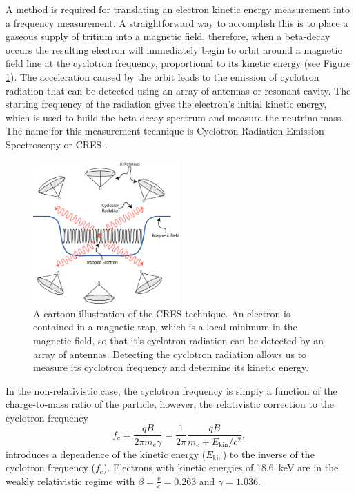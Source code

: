 A method is required for translating an electron kinetic energy measurement into a frequency measurement. A straightforward way to accomplish this is to place a gaseous supply of tritium into a magnetic field, therefore, when a beta-decay occurs the resulting electron will immediately begin to orbit around a magnetic field line at the cyclotron frequency, proportional to its kinetic energy (see Figure \ref{fig:chap3-cres-cartoon}). The acceleration caused by the orbit leads to the emission of cyclotron radiation that can be detected using an array of antennas or resonant cavity. The starting frequency of the radiation gives the electron's initial kinetic energy, which is used to build the beta-decay spectrum and measure the neutrino mass. The name for this measurement technique is Cyclotron Radiation Emission Spectroscopy or CRES \cite{p8originalcres}.

\begin{figure}[htbp]
    \centering
    \includegraphics[width=0.5\textwidth]{figs/Chapter-3/230303_cres_cartoon.png}
    \caption{A cartoon illustration of the CRES technique. An electron is contained in a magnetic trap, which is a local minimum in the magnetic field, so that it's cyclotron radiation can be detected by an array of antennas. Detecting the cyclotron radiation allows us to measure its cyclotron frequency and determine its kinetic energy.}
    \label{fig:chap3-cres-cartoon}
\end{figure}

In the non-relativistic case, the cyclotron frequency is simply a function of the charge-to-mass ratio of the particle, however, the relativistic correction to the cyclotron frequency
\begin{equation}
    f_c = \frac{qB}{2\pi m_e\gamma}=\frac{1}{2\pi}\frac{qB}{m_e+E_\mathrm{kin}/c^2},
    \label{eq:chap3-cyclotron-freq}
\end{equation} 
introduces a dependence of the kinetic energy ($E_\mathrm{kin}$) to the inverse of the cyclotron frequency ($f_c$). Electrons with kinetic energies of 18.6~keV are in the weakly relativistic regime with $\beta=\frac{v}{c}=0.263$ and $\gamma=1.036$.

